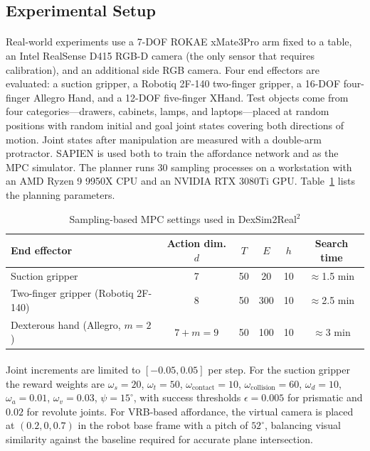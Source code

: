 \documentclass[12pt,a4paper,final]{extreport}
\begin{document}
\subsection{Experimental Setup}

\paragraph{} Real-world experiments use a 7-DOF ROKAE xMate3Pro arm fixed to a table, an Intel RealSense D415 RGB-D camera (the only sensor that requires calibration), and an additional side RGB camera. Four end effectors are evaluated: a suction gripper, a Robotiq 2F-140 two-finger gripper, a 16-DOF four-finger Allegro Hand, and a 12-DOF five-finger XHand. Test objects come from four categories---drawers, cabinets, lamps, and laptops---placed at random positions with random initial and goal joint states covering both directions of motion. Joint states after manipulation are measured with a double-arm protractor. SAPIEN is used both to train the affordance network and as the MPC simulator. The planner runs 30 sampling processes on a workstation with an AMD Ryzen 9 9950X CPU and an NVIDIA RTX 3080Ti GPU. Table~\ref{tab:dex_params} lists the planning parameters.

{\renewcommand{\arraystretch}{1.2}
\begin{table}[htbp]
\centering
\caption{Sampling-based MPC settings used in DexSim2Real$^2$ \cite{p1}}\label{tab:dex_params}
\small
\begin{tabular}{|l|c|c|c|c|c|}
\hline
\textbf{End effector} & \textbf{Action dim.} $d$ & $T$ & $E$ & $h$ & \textbf{Search time} \\ \hline
Suction gripper & 7 & 50 & 20 & 10 & $\approx$1.5 min \\ \hline
Two-finger gripper (Robotiq 2F-140) & 8 & 50 & 300 & 10 & $\approx$2.5 min \\ \hline
Dexterous hand (Allegro, $m=2$) & $7+m=9$ & 50 & 100 & 10 & $\approx$3 min \\ \hline
\end{tabular}
\end{table}}

\paragraph{} Joint increments are limited to $[-0.05,0.05]$ per step. For the suction gripper the reward weights are $\omega_s=20$, $\omega_t=50$, $\omega_{\mathrm{contact}}=10$, $\omega_{\mathrm{collision}}=60$, $\omega_d=10$, $\omega_a=0.01$, $\omega_v=0.03$, $\psi=15^{\circ}$, with success thresholds $\epsilon=0.005$ for prismatic and $0.02$ for revolute joints. For VRB-based affordance, the virtual camera is placed at $(0.2,0,0.7)$ in the robot base frame with a pitch of $52^{\circ}$, balancing visual similarity against the baseline required for accurate plane intersection.
\end{document}
